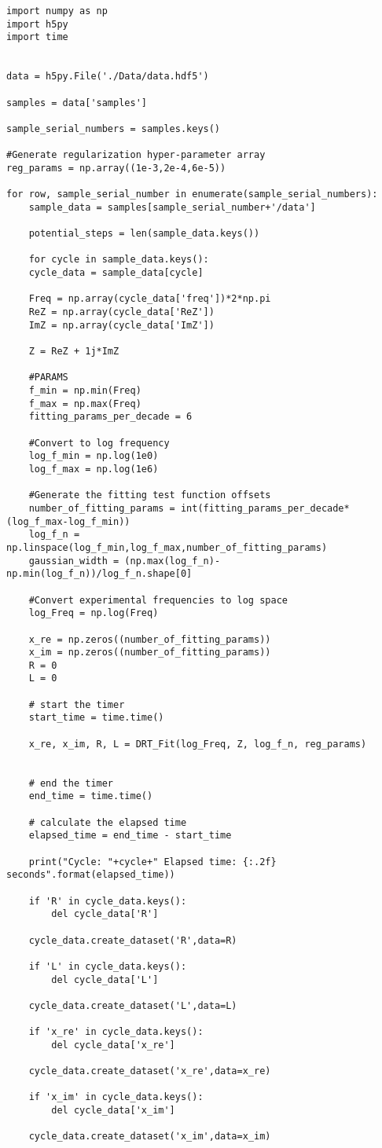 \documentclass[11pt]{article}
\begin{document}
\begin{verbatim}
import numpy as np
import h5py
import time


data = h5py.File('./Data/data.hdf5')

samples = data['samples']

sample_serial_numbers = samples.keys()

#Generate regularization hyper-parameter array
reg_params = np.array((1e-3,2e-4,6e-5))

for row, sample_serial_number in enumerate(sample_serial_numbers):
    sample_data = samples[sample_serial_number+'/data']

    potential_steps = len(sample_data.keys())

    for cycle in sample_data.keys():
	cycle_data = sample_data[cycle]

	Freq = np.array(cycle_data['freq'])*2*np.pi
	ReZ = np.array(cycle_data['ReZ'])
	ImZ = np.array(cycle_data['ImZ'])

	Z = ReZ + 1j*ImZ

	#PARAMS
	f_min = np.min(Freq)
	f_max = np.max(Freq)
	fitting_params_per_decade = 6

	#Convert to log frequency
	log_f_min = np.log(1e0)
	log_f_max = np.log(1e6)

	#Generate the fitting test function offsets
	number_of_fitting_params = int(fitting_params_per_decade*(log_f_max-log_f_min))
	log_f_n = np.linspace(log_f_min,log_f_max,number_of_fitting_params)
	gaussian_width = (np.max(log_f_n)-np.min(log_f_n))/log_f_n.shape[0]

	#Convert experimental frequencies to log space
	log_Freq = np.log(Freq)

	x_re = np.zeros((number_of_fitting_params))
	x_im = np.zeros((number_of_fitting_params))
	R = 0
	L = 0

	# start the timer
	start_time = time.time()

	x_re, x_im, R, L = DRT_Fit(log_Freq, Z, log_f_n, reg_params)


	# end the timer
	end_time = time.time()

	# calculate the elapsed time
	elapsed_time = end_time - start_time

	print("Cycle: "+cycle+" Elapsed time: {:.2f} seconds".format(elapsed_time))

	if 'R' in cycle_data.keys():
	    del cycle_data['R']

	cycle_data.create_dataset('R',data=R)

	if 'L' in cycle_data.keys():
	    del cycle_data['L']

	cycle_data.create_dataset('L',data=L)

	if 'x_re' in cycle_data.keys():
	    del cycle_data['x_re']

	cycle_data.create_dataset('x_re',data=x_re)

	if 'x_im' in cycle_data.keys():
	    del cycle_data['x_im']

	cycle_data.create_dataset('x_im',data=x_im)

\end{verbatim}
\end{document}
